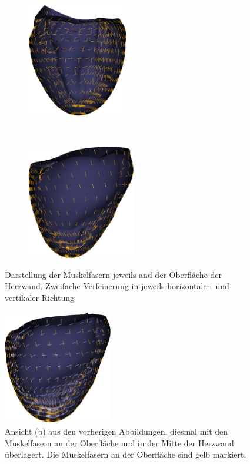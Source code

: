 \documentclass[
	a4paper,			%
	11pt,				%
	headsepline,		%
	bibtotoc,			%
	BCOR18mm,      		%
	DIV14,				%
	headings=normal,
	numbers=noenddot,
]{scrbook}
\theoremstyle{mythmstyle}
\theoremstyle{other}
\begin{document}
			\begin{figure}[t]
	
	\begin{subfigure}[t]{0.5\textwidth}
		\centering
		\includegraphics[height=5cm]{fibers_200_1_surface.png}%
		\caption{}
	\end{subfigure}
	~
	\begin{subfigure}[t]{0.5\textwidth}
		\centering
		\includegraphics[height=5cm]{fibers_200_2_surface.png}%
		\caption{}
	\end{subfigure}
	
	
	\caption{Darstellung der Muskelfasern jeweils and der Oberfläche der Herzwand. Zweifache Verfeinerung in
	jeweils horizontaler- und vertikaler Richtung}
		
	\label{figure:fibers_200_surface}
	\end{figure}
	\begin{figure}
	\centering
	\includegraphics[height=5cm]{fibers_200_2_surface_center.png}
	\caption{Ansicht (b) aus den vorherigen Abbildungen, diesmal mit den Muskelfasern an der Oberfläche und
	in der Mitte der Herzwand überlagert. Die Muskelfasern an der Oberfläche sind gelb markiert.}
	\label{figure:fibers_200_2_surface_center}
	\end{figure}
\end{document}
